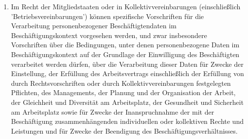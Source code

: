 \begin{enumerate}
   \item Im Recht der Mitgliedstaaten oder in Kollektivvereinbarungen (einschließlich ’Betriebsvereinbarungen’) können
    spezifische Vorschriften für die Verarbeitung personenbezogener Beschäftigtendaten im Beschäftigungskontext
    vorgesehen werden, und zwar insbesondere Vorschriften über die Bedingungen, unter denen personenbezogene Daten im
    Beschäftigungskontext auf der Grundlage der Einwilligung des Beschäftigten verarbeitet werden dürfen, über die
    Verarbeitung dieser Daten für Zwecke der Einstellung, der Erfüllung des Arbeitsvertrags einschließlich der
    Erfüllung von durch Rechtsvorschriften oder durch Kollektivvereinbarungen festgelegten Pflichten, des Managements,
    der Planung und der Organisation der Arbeit, der Gleichheit und Diversität am Arbeitsplatz, der Gesundheit und
    Sicherheit am Arbeitsplatz sowie für Zwecke der Inanspruchnahme der mit der Beschäftigung zusammenhängenden
    individuellen oder kollektiven Rechte und Leistungen und für Zwecke der Beendigung des
    Beschäftigungsverhältnisses.%
   \label{eg:155}
   


\end{enumerate}
